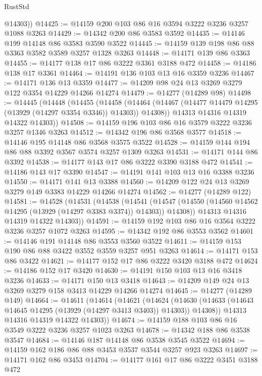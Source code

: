 \begin{lexlean}{RustStd}
\begin{coremodule}
        @14303))
@14425 := @14159 @200 @103 @86 @16 @3594 @3222 @3236 @3257 @1088 @3263
@14429 := @14342 @200 @86 @3583 @3592
@14435 := @14146 @199 @14148 @86 @3583 @3590 @3522
@14445 := @14159 @139 @198 @86 @88 @3363 @3582 @3589 @3257 @1328 @3263
@14448 := @14171 @139 @86 @3363
@14455 := @14177 @138 @17 @86 @3222 @3361 @3188 @472
@14458 := @14186 @138 @17 @3361
@14464 := @14191 @136 @103 @13 @16 @3359 @3236
@14467 := @14171 @136 @13 @3359
@14477 := @14209 @98 @24 @13 @3269 @3279 @122 @3354 @14229 @14266 @14274
@14479 := @14277 (@14289 @98)
@14498 := @14445
    (@14448
      (@14455
        (@14458
          (@14464 (@14467 (@14477 @14479 @14295 (@13929 (@14297 @3354 @3346)) @14303)) @14308))
        @14313
        @14316
        @14319
        @14322
        @14303))
@14508 := @14159 @196 @103 @86 @16 @3579 @3222 @3236 @3257 @1346 @3263
@14512 := @14342 @196 @86 @3568 @3577
@14518 := @14146 @195 @14148 @86 @3568 @3575 @3522
@14528 := @14159 @144 @194 @86 @88 @3392 @3567 @3574 @3257 @1309 @3263
@14531 := @14171 @144 @86 @3392
@14538 := @14177 @143 @17 @86 @3222 @3390 @3188 @472
@14541 := @14186 @143 @17 @3390
@14547 := @14191 @141 @103 @13 @16 @3388 @3236
@14550 := @14171 @141 @13 @3388
@14560 := @14209 @122 @24 @13 @3269 @3279 @149 @3383 @14229 @14266 @14274
@14562 := @14277 (@14289 @122)
@14581 := @14528
    (@14531
      (@14538
        (@14541
          (@14547 (@14550 (@14560 @14562 @14295 (@13929 (@14297 @3383 @3374)) @14303)) @14308))
        @14313
        @14316
        @14319
        @14322
        @14303))
@14591 := @14159 @192 @103 @86 @16 @3564 @3222 @3236 @3257 @1072 @3263
@14595 := @14342 @192 @86 @3553 @3562
@14601 := @14146 @191 @14148 @86 @3553 @3560 @3522
@14611 := @14159 @153 @190 @86 @88 @3422 @3552 @3559 @3257 @951 @3263
@14614 := @14171 @153 @86 @3422
@14621 := @14177 @152 @17 @86 @3222 @3420 @3188 @472
@14624 := @14186 @152 @17 @3420
@14630 := @14191 @150 @103 @13 @16 @3418 @3236
@14633 := @14171 @150 @13 @3418
@14643 := @14209 @149 @24 @13 @3269 @3279 @158 @3413 @14229 @14266 @14274
@14645 := @14277 (@14289 @149)
@14664 := @14611
    (@14614
      (@14621
        (@14624
          (@14630 (@14633 (@14643 @14645 @14295 (@13929 (@14297 @3413 @3403)) @14303)) @14308))
        @14313
        @14316
        @14319
        @14322
        @14303))
@14674 := @14159 @188 @103 @86 @16 @3549 @3222 @3236 @3257 @1023 @3263
@14678 := @14342 @188 @86 @3538 @3547
@14684 := @14146 @187 @14148 @86 @3538 @3545 @3522
@14694 := @14159 @162 @186 @86 @88 @3453 @3537 @3544 @3257 @923 @3263
@14697 := @14171 @162 @86 @3453
@14704 := @14177 @161 @17 @86 @3222 @3451 @3188 @472

\end{coremodule}
\end{lexlean}
